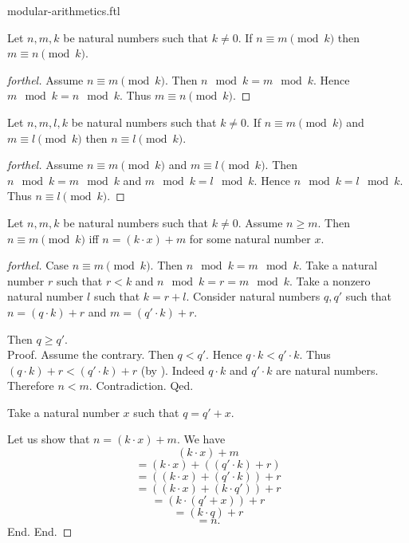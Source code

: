 \documentclass{naproche-library}
\begin{document}
\begin{smodule}{modular-arithmetics.ftl}
  \begin{proposition}[forthel,id=ARITHMETIC_08_2337210737098752]
    Let $n, m, k$ be natural numbers such that $k \neq 0$.
    If $n \equiv m \pmod{k}$ then $m \equiv n \pmod{k}$.
  \end{proposition}
  \begin{proof}[forthel]
    Assume $n \equiv m \pmod{k}$.
    Then $n \mod k = m \mod k$.
    Hence $m \mod k = n \mod k$.
    Thus $m \equiv n \pmod{k}$.
  \end{proof}

  \begin{proposition}[forthel,id=ARITHMETIC_08_7464329746055168]
    Let $n, m, l, k$ be natural numbers such that $k \neq 0$.
    If $n \equiv m \pmod{k}$ and $m \equiv l \pmod{k}$ then $n \equiv l \pmod{k}$.
  \end{proposition}
  \begin{proof}[forthel]
    Assume $n \equiv m \pmod{k}$ and $m \equiv l \pmod{k}$.
    Then $n \mod k = m \mod k$ and $m \mod k = l \mod k$.
    Hence $n \mod k = l \mod k$.
    Thus $n \equiv l \pmod{k}$.
  \end{proof}

  \begin{proposition}[forthel,id=ARITHMETIC_08_2034122983735296]
    Let $n, m, k$ be natural numbers such that $k \neq 0$.
    Assume $n \geq m$.
    Then $n \equiv m \pmod{k}$ iff $n = (k \cdot x) + m$ for some natural number $x$.
  \end{proposition}
  \begin{proof}[forthel]
    Case $n \equiv m \pmod{k}$.
      Then $n \mod k = m \mod k$.
      Take a natural number $r$ such that $r < k$ and $n \mod k = r = m \mod k$.
      Take a nonzero natural number $l$ such that $k = r + l$.
      Consider natural numbers $q,q'$ such that $n = (q \cdot k) + r$ and $m = (q' \cdot k) + r$.

      Then $q \geq q'$. \\
      Proof.
        Assume the contrary.
        Then $q < q'$.
        Hence $q \cdot k < q' \cdot k$.
        Thus $(q \cdot k) + r < (q' \cdot k) + r$ (by ).
        Indeed $q \cdot k$ and $q' \cdot k$ are natural numbers.
        Therefore $n < m$.
        Contradiction.
      Qed.

      Take a natural number $x$ such that $q = q' + x$.

      Let us show that $n = (k \cdot x) + m$.
        We have
        \[  (k \cdot x) + m                       \]
        \[    = (k \cdot x) + ((q' \cdot k) + r)  \]
        \[    = ((k \cdot x) + (q' \cdot k)) + r  \]
        \[    = ((k \cdot x) + (k \cdot q')) + r  \]
        \[    = (k \cdot (q' + x)) + r            \]
        \[    = (k \cdot q) + r                   \]
        \[    = n.                                \]
      End.
    End.


\end{proof}
\end{smodule}
\end{document}
